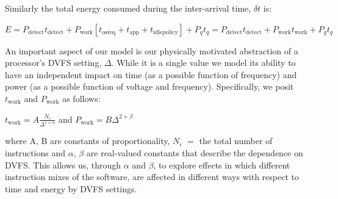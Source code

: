 

Similarly the total energy consumed during the inter-arrival time, $\delta t$ is:

$\boxed{E = P_\text{detect} t_{\text{detect}} + P_{\text{work}} \left[t_{\text{osreq}} + t_{\text{app}} + t_{\text{idlepolicy}}\right] + P_q t_q} = P_\text{detect} t_{\text{detect}} + P_{\text{work}} t_{\text{work}} + P_q t_q$


An important aspect of our model is our physically motivated abstraction of a processor's DVFS setting, $\Delta$.  While it is a single value we model its ability to have an independent impact on time (as a possible function of frequency) and power (as a possible function of voltage and frequency).  Specifically, we posit 
$t_{\text{work}}$ and $P_{\text{work}}$ as follows:

$t_{\text{work}} = A\frac{N_i}{\Delta^{1+\alpha}}$ and $P_{\text{work}} = B \Delta^{2+\beta}$

where A, B are constants of proportionality, $N_i$ $=$ the total number of instructions and $\alpha$, $\beta$ are real-valued constants that describe the dependence on DVFS.  This allows us, through $\alpha$ and $\beta$, to explore effects in which different instruction mixes of the software, are affected in different ways with respect to time and energy by DVFS settings.  




